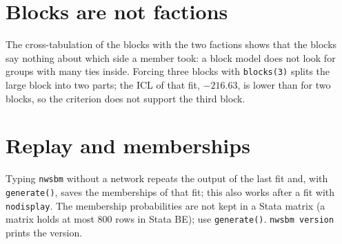 \section{Blocks are not factions}
The cross-tabulation of the blocks with the two factions shows that the blocks say nothing about which side a member took: a block model does not look for groups with many ties inside. Forcing three blocks with \texttt{blocks(3)} splits the large block into two parts; the ICL of that fit, $-216.63$, is lower than for two blocks, so the criterion does not support the third block.

\section{Replay and memberships}
Typing \texttt{nwsbm} without a network repeats the output of the last fit and, with \texttt{generate()}, saves the memberships of that fit; this also works after a fit with \texttt{nodisplay}. The membership probabilities are not kept in a Stata matrix (a matrix holds at most 800 rows in Stata BE); use \texttt{generate()}. \texttt{nwsbm version} prints the version.
